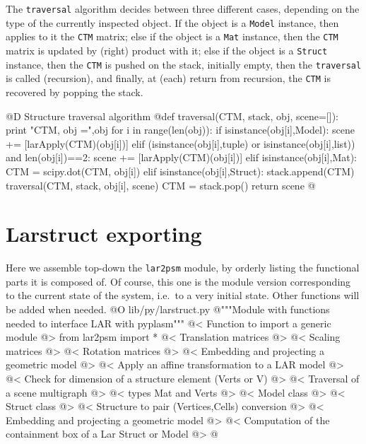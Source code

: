 \documentclass[11pt,oneside]{article}    %
\begin{document}
The \texttt{traversal} algorithm decides between three different cases, depending on the type of the currently inspected object. If the object is a \texttt{Model} instance, then applies to it the \texttt{CTM} matrix; else if the object is a \texttt{Mat} instance, then the \texttt{CTM} matrix is updated by (right) product with it; else if the object is a \texttt{Struct} instance, then the \texttt{CTM} is pushed on the stack, initially empty, then the \texttt{traversal} is called (recursion), and finally, at (each) return from recursion, the \texttt{CTM} is recovered by popping the stack.

@D Structure traversal algorithm 
@{def traversal(CTM, stack, obj, scene=[]):
    print "\n CTM, obj =",obj
    for i in range(len(obj)):
        if isinstance(obj[i],Model): 
            scene += [larApply(CTM)(obj[i])]
        elif (isinstance(obj[i],tuple) or isinstance(obj[i],list)) and len(obj[i])==2:
            scene += [larApply(CTM)(obj[i])]
        elif isinstance(obj[i],Mat): 
            CTM = scipy.dot(CTM, obj[i])
        elif isinstance(obj[i],Struct):
            stack.append(CTM) 
            traversal(CTM, stack, obj[i], scene)
            CTM = stack.pop()
    return scene
@}


\section{Larstruct exporting}
\label{sec:larstruct}
Here we assemble top-down the \texttt{lar2psm} module, by orderly listing the functional parts it is composed of. Of course, this one is the module version corresponding to the current state of the system, i.e.~to a very initial state. Other functions will be added when needed.
@O lib/py/larstruct.py
@{"""Module with functions needed to interface LAR with pyplasm"""
@< Function to import a generic module @>
from lar2psm import *
@< Translation matrices @>
@< Scaling matrices @>
@< Rotation matrices @>
@< Embedding and projecting a geometric model @>
@< Apply an affine transformation to a LAR model @>
@< Check for dimension of a structure element (Verts or V) @>
@< Traversal of a scene multigraph @>
@< types Mat and Verts @>
@< Model class @>
@< Struct class @>
@< Structure to pair (Vertices,Cells) conversion @>
@< Embedding and projecting a geometric model @>
@< Computation of the containment box of a Lar Struct or Model @>
@}
\end{document}
